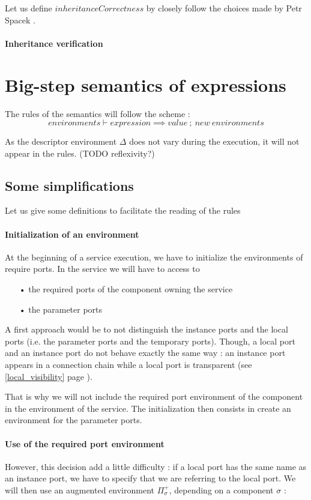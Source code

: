 Let us define $inheritanceCorrectness$ by closely follow the choices made by Petr Spacek \cite{Spa13}.

\paragraph{Inheritance verification}



\section{Big-step semantics of expressions}
The rules of the semantics will follow the scheme :
\[environments \vdash expression \implies value~;~new~environments\]

As the descriptor environment $\Delta$ does not vary during the execution, it will not appear in the rules. (TODO reflexivity?)

\subsection{Some simplifications}
Let us give some definitions to facilitate the reading of the rules

\paragraph{Initialization of an environment}
At the beginning of a service execution, we have to initialize the environments of require ports. In the service we will have to access to
\begin{itemize}
\item[•]the required ports of the component owning the service
\item[•]the parameter ports 
\end{itemize}

A first approach would be to not distinguish the instance ports and the local ports (i.e. the parameter ports and the temporary ports). Though, a local port and an instance port do not behave exactly the same way : an instance port appears in a connection chain while a local port is transparent (see \ref{local_visibility} page \pageref{local_visibility}).

That is why we will not include the required port environment of the component in the environment of the service. The initialization then consists in create an environment for the parameter ports.

\paragraph{Use of the required port environment}
However, this decision add a little difficulty : if a local port has the same name as an instance port, we have to specify that we are referring to the local port. We will then use an augmented environment $\Pi_\sigma^+$, depending on a component $\sigma$ :


